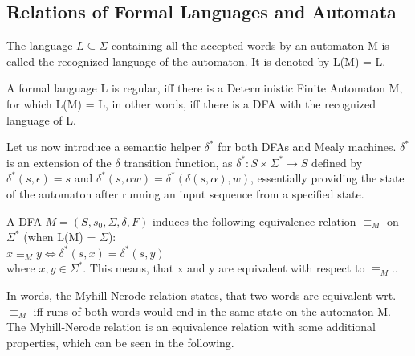 \subsection{Relations of Formal Languages and Automata}

\begin{definition}
	The language $L\subseteq\Sigma$ containing all the accepted words by an automaton M is called the recognized language of the automaton. It is denoted by L(M) = L.
\end{definition}

\begin{definition}
	A formal language L is regular, iff there is a Deterministic Finite Automaton M, for which L(M) = L, in other words, iff there is a DFA with the recognized language of L.
\end{definition}

Let us now introduce a semantic helper $\delta^*$ for both DFAs and Mealy machines. $\delta^*$ is an extension of the $\delta$ transition function, as $\delta^*: S\times\Sigma^* \to S$ defined by $\delta^*(s,\epsilon) = s$ and $\delta^*(s, \alpha w) = \delta^*(\delta(s, \alpha), w)$, essentially providing the state of the automaton after running an input sequence from a specified state.

\begin{definition} 
	A DFA $M=(S,s_{0},\Sigma,\delta,F)$ induces the following equivalence relation $\equiv_M$ on $\Sigma^*$ (when L(M) = $\Sigma$):\\
	\null\qquad$x\equiv_M y \iff \delta^*(s, x) = \delta^*(s, y)$\\
	where $x, y\in\Sigma^*$. This means, that x and y are equivalent with respect to $\equiv_M$.\cite{Kozen1977}.
\end{definition}

In words, the Myhill-Nerode relation states, that two words are equivalent wrt. $\equiv_M$ iff runs of both words would end in the same state on the automaton M. The Myhill-Nerode relation is an equivalence relation with some additional properties\cite{Kozen1977}, which can be seen in the following.


